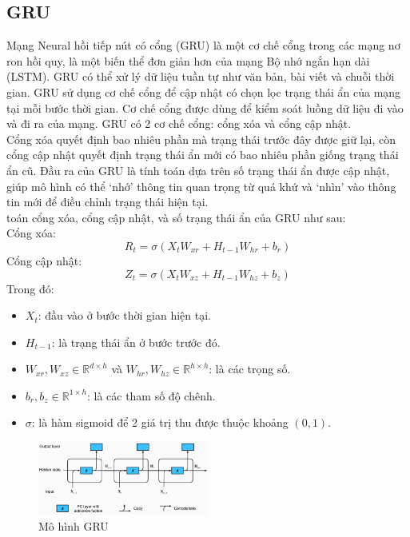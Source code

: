 \documentclass[conference]{IEEEtran}
\begin{document}
\subsection{GRU}
Mạng Neural hồi tiếp nút có cổng (GRU) là một cơ chế cổng trong các mạng nơ ron hồi quy, là một biến thể đơn giản hơn của mạng Bộ nhớ ngắn hạn dài (LSTM). GRU có thể xử lý dữ liệu tuần tự như văn bản, bài viết và chuỗi thời gian.
GRU sử dụng cơ chế cổng để cập nhật có chọn lọc trạng thái ẩn của mạng tại mỗi bước thời gian. Cơ chế cổng được dùng để kiểm soát luồng dữ liệu đi vào và đi ra của mạng. GRU có 2 cơ chế cổng: cổng xóa và cổng cập nhật. \\
Cổng xóa quyết định bao nhiêu phần mà trạng thái trước đây được giữ lại, còn cổng cập nhật quyết định trạng thái ẩn mới có bao nhiêu phần giống trạng thái ẩn cũ. Đầu ra của GRU là tính toán dựa trên số trạng thái ẩn được cập nhật, giúp mô hình có thể ‘nhớ’ thông tin quan trọng từ quá khứ và ‘nhìn’ vào thông tin mới để điều chỉnh trạng thái hiện tại.\\ toán cổng xóa, cổng cập nhật, và số trạng thái ẩn của GRU như sau:\\
Cổng xóa:
\[
R_t = \sigma(X_t W_{xr} + H_{t-1} W_{hr} + b_r)
\]
Cổng cập nhật:
\[
Z_t = \sigma(X_t W_{xz} + H_{t-1} W_{hz} + b_z)
\]
Trong đó:\\
\begin{itemize}
    \item $X_t$: đầu vào ở bước thời gian hiện tại.
    \item $H_{t-1}$: là trạng thái ẩn ở bước trước đó.
    \item $W_{xr}, W_{xz} \in \mathbb{R}^{d \times h}$ và $W_{hr}, W_{hz} \in \mathbb{R}^{h \times h}$: là các trọng số.
    \item $b_r, b_z \in \mathbb{R}^{1 \times h}$: là các tham số độ chênh.
    \item $\sigma$: là hàm sigmoid để 2 giá trị thu được thuộc khoảng $(0,1)$.
\end{itemize}

\vspace{-1em} %
\begin{figure}[H]
    \centering
    \includegraphics[width=0.5\textwidth]{bibliography/Figure/GRUModel.png}
    \caption{Mô hình GRU}
    \label{fig:GRU_Model}
\end{figure}
\end{document}
